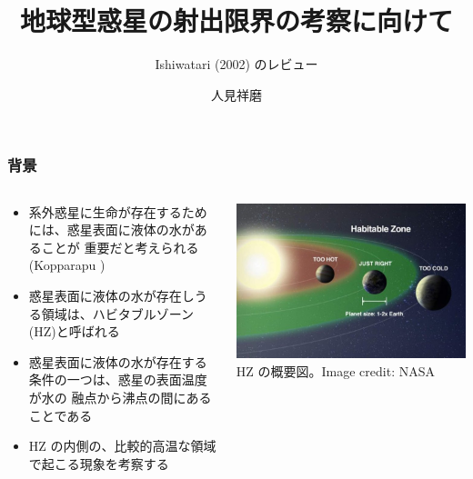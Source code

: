 \documentclass[aspectratio=149,9pt,]{beamer}
\institute{北海道大学大学院理学院 地球流体力学研究室 M2}
\author{人見祥磨}
\title{地球型惑星の射出限界の考察に向けて}
\subtitle{Ishiwatari \etal (2002) のレビュー}
\begin{document}
\maketitle

\begin{frame}
	\frametitle{背景}
	\begin{columns}[T,onlytextwidth]
		\begin{column}{.6\textwidth}
			\begin{itemize}
				\item 系外惑星に生命が存在するためには、惑星表面に液体の水があることが
					重要だと考えられる (Kopparapu )
				\item 惑星表面に液体の水が存在しうる領域は、ハビタブルゾーン (HZ)と呼ばれる
				\item 惑星表面に液体の水が存在する条件の一つは、惑星の表面温度が水の
					融点から沸点の間にあることである
				\item HZ の内側の、比較的高温な領域で起こる現象を考察する
			\end{itemize}
		\end{column}
		\begin{column}{.35\textwidth}
			\centering
			\includegraphics[width=\textwidth]{hz.jpg}\\
			\scriptsize HZ の概要図。Image credit: NASA
		\end{column}
	\end{columns}
\end{frame}
\end{document}

